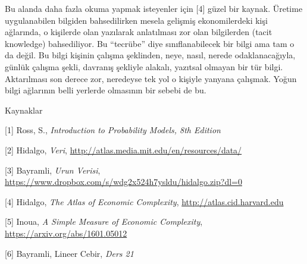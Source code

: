 \documentclass[12pt,fleqn]{article}\usepackage{../../common}
\begin{document}
Bu alanda daha fazla okuma yapmak isteyenler için [4] güzel bir
kaynak. Üretime uygulanabilen bilgiden bahsedilirken mesela gelişmiş
ekonomilerdeki kişi ağlarında, o kişilerde olan yazılarak anlatılması zor
olan bilgilerden (tacit knowledge) bahsediliyor. Bu ``tecrübe'' diye
sınıflanabilecek bir bilgi ama tam o da değil. Bu bilgi kişinin çalışma
şeklinden, neye, nasıl, nerede odaklanacağıyla, günlük çalışma şekli,
davranış şekliyle alakalı, yazıtsal olmayan bir tür bilgi. Aktarılması son
derece zor, neredeyse tek yol o kişiyle yanyana çalışmak. Yoğun bilgi
ağlarının belli yerlerde olmasının bir sebebi de bu.

Kaynaklar

[1] Ross, S., {\em Introduction to Probability Models, 8th Edition}

[2] Hidalgo, {\em Veri}, \url{http://atlas.media.mit.edu/en/resources/data/}

[3] Bayramli, {\em Urun Verisi}, \url{https://www.dropbox.com/s/wdg2x524h7ysldu/hidalgo.zip?dl=0}

[4] Hidalgo, {\em The Atlas of Economic Complexity}, \url{http://atlas.cid.harvard.edu}

[5] Inoua, {\em A Simple Measure of Economic Complexity}, \url{https://arxiv.org/abs/1601.05012}

[6] Bayramli, Lineer Cebir, {\em Ders 21}
\end{document}
